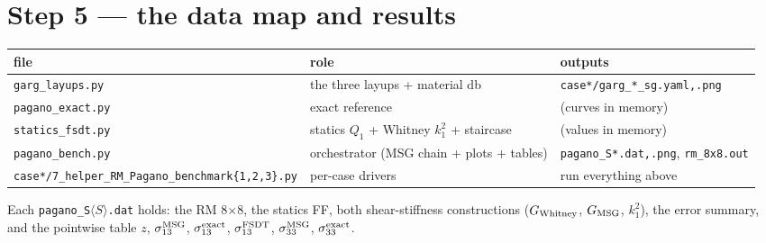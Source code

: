 \documentclass[11pt]{article}
\newcommand{\code}[1]{\texttt{#1}}
\begin{document}
\section{Step 5 --- the data map and results}

\begin{center}\small
\begin{tabular}{lll}
\toprule
file & role & outputs \\
\midrule
\code{garg\_layups.py} & the three layups + material db & \code{case*/garg\_*\_sg.yaml,.png}\\
\code{pagano\_exact.py} & exact reference & (curves in memory)\\
\code{statics\_fsdt.py} & statics $Q_1$ + Whitney $k_1^2$ + staircase & (values in memory)\\
\code{pagano\_bench.py} & orchestrator (MSG chain + plots + tables) & \code{pagano\_S*.dat,.png}, \code{rm\_8x8.out}\\
\code{case*/7\_helper\_RM\_Pagano\_benchmark\{1,2,3\}.py} & per-case drivers & run everything above\\
\bottomrule
\end{tabular}
\end{center}

Each \code{pagano\_S$\langle S\rangle$.dat} holds: the RM 8$\times$8, the statics FF,
both shear-stiffness constructions ($G_{\rm Whitney}$, $G_{\rm MSG}$, $k_1^2$), the
error summary, and the pointwise table $z$, $\sigma_{13}^{\rm MSG}$,
$\sigma_{13}^{\rm exact}$, $\sigma_{13}^{\rm FSDT}$, $\sigma_{33}^{\rm MSG}$,
$\sigma_{33}^{\rm exact}$.
\end{document}
